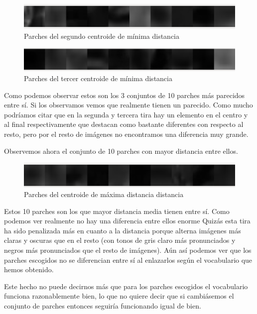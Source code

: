 \documentclass[12pt,a4paper]{article}
\begin{document}
\begin{figure}[H]
  \centering
  \includegraphics[scale=1.1]{./Imagenes/Ejercicio3-2.png}
  \caption{Parches del segundo centroide de mínima distancia}
	\label{Ejercicio3-2}
\end{figure}

\begin{figure}[H]
  \centering
  \includegraphics[scale=1.1]{./Imagenes/Ejercicio3-3.png}
  \caption{Parches del tercer centroide de mínima distancia}
	\label{Ejercicio3-3}
\end{figure}

Como podemos observar estos son los 3 conjuntos de 10 parches más parecidos entre sí. Si los observamos vemos que realmente tienen un parecido. Como mucho podríamos citar que en la segunda y tercera tira hay un elemento en el centro y al final respectivamente que destacan como bastante diferentes con respecto al resto, pero por el resto de imágenes no encontramos una diferencia muy grande.

\vspace{10px}

Observemos ahora el conjunto de 10 parches con mayor distancia entre ellos.

\begin{figure}[H]
  \centering
  \includegraphics[scale=1.1]{./Imagenes/Ejercicio3-4.png}
  \caption{Parches del centroide de máxima distancia distancia}
	\label{Ejercicio3-4}
\end{figure}

Estos 10 parches son los que mayor distancia media tienen entre sí. Como podemos ver realmente no hay una diferencia entre ellos enorme Quizás esta tira ha sido penalizada más en cuanto a la distancia porque alterna imágenes más claras y oscuras que en el resto (con tonos de gris claro más pronunciados y negros más pronunciados que el resto de imágenes). Aún así podemos ver que los parches escogidos no se diferencian entre sí al enlazarlos según el vocabulario que hemos obtenido.

\vspace{10px}

Este hecho no puede decirnos más que para los parches escogidos el vocabulario funciona razonablemente bien, lo que no quiere decir que si cambiásemos el conjunto de parches entonces seguiría funcionando igual de bien.
\end{document}
